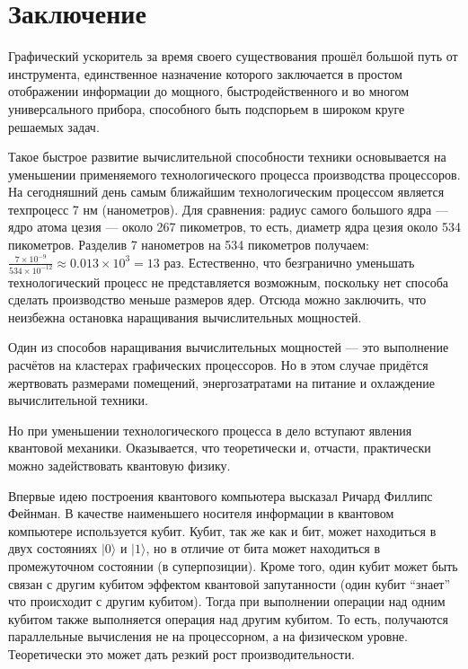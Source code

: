 \section {Заключение}

Графический ускоритель за время своего существования прошёл большой путь от инструмента, единственное назначение которого заключается в простом отображении информации до мощного, быстродейственного и во многом универсального прибора, способного быть подспорьем в широком круге решаемых задач.

Такое быстрое развитие вычислительной способности техники основывается на уменьшении применяемого технологического процесса производства процессоров. На сегодняшний день самым ближайшим технологическим процессом является техпроцесс 7 нм (нанометров)\cite{samsung7nm}. Для сравнения: радиус самого большого ядра --- ядро атома цезия --- около 267 пикометров\cite{chemege}, то есть, диаметр ядра цезия около 534 пикометров. Разделив 7 нанометров на 534 пикометров получаем: $\frac {7 \times 10^{-9}} {534 \times 10^{-12}} \approx 0.013 \times 10^3 = 13$ раз. Естественно, что безгранично уменьшать технологический процесс не представляется возможным, поскольку нет способа сделать производство меньше размеров ядер. Отсюда можно заключить, что неизбежна остановка наращивания вычислительных мощностей.

Один из способов наращивания вычислительных мощностей --- это выполнение расчётов на кластерах графических процессоров. Но в этом случае придётся жертвовать размерами помещений, энергозатратами на питание и охлаждение вычислительной техники.

Но при уменьшении технологического процесса в дело вступают явления квантовой механики. Оказывается, что теоретически и, отчасти, практически можно задействовать квантовую физику.

Впервые идею построения квантового компьютера высказал Ричард Филлипс Фейнман\cite{ran}. В качестве наименьшего носителя информации в квантовом компьютере используется кубит. Кубит, так же как и бит, может находиться в двух состояниях $|0\rangle$ и $|1\rangle$, но в отличие от бита может находиться в промежуточном состоянии (в суперпозиции). Кроме того, один кубит может быть связан с другим кубитом эффектом квантовой запутанности (один кубит ``знает'' что происходит с другим кубитом). Тогда при выполнении операции над одним кубитом также выполняется операция над другим кубитом. То есть, получаются параллельные вычисления не на процессорном, а на физическом уровне. Теоретически это может дать резкий рост производительности.

